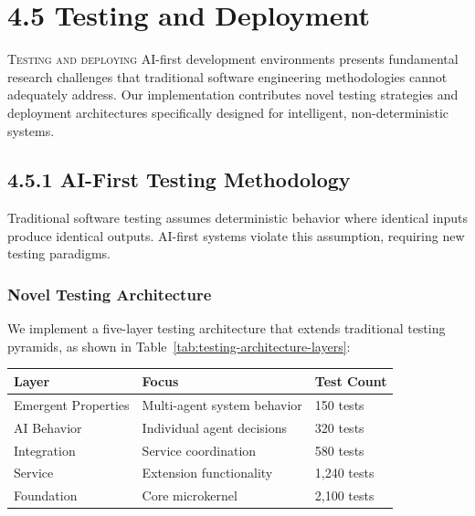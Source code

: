 

\section{4.5 Testing and Deployment}
\label{sec:testing-deployment-impl}

\lettrine{T}{esting and deploying} AI-first development environments presents fundamental research challenges that traditional software engineering methodologies cannot adequately address. Our implementation contributes novel testing strategies and deployment architectures specifically designed for intelligent, non-deterministic systems.

\subsection*{4.5.1 AI-First Testing Methodology}
\label{subsec:ai-first-testing}

Traditional software testing assumes deterministic behavior where identical inputs produce identical outputs. AI-first systems violate this assumption, requiring new testing paradigms.

\subsubsection*{Novel Testing Architecture}

We implement a five-layer testing architecture that extends traditional testing pyramids, as shown in Table~\ref{tab:testing-architecture-layers}:

\begin{center}
\begin{tabular}{@{}lll@{}}
\toprule
\textbf{Layer} & \textbf{Focus} & \textbf{Test Count} \\
\midrule
Emergent Properties & Multi-agent system behavior & 150 tests \\
AI Behavior & Individual agent decisions & 320 tests \\
Integration & Service coordination & 580 tests \\
Service & Extension functionality & 1,240 tests \\
Foundation & Core microkernel & 2,100 tests \\
\bottomrule
\end{tabular}
\label{tab:testing-architecture-layers}
\end{center}

